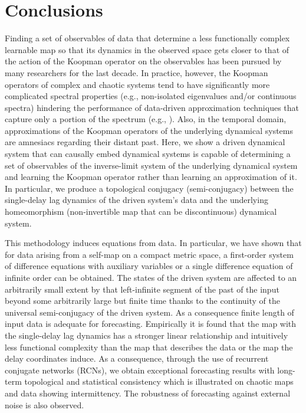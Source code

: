\documentclass[12 pt]{article}
\begin{document}


\section{Conclusions}
 Finding a set of observables of data that determine a less functionally complex learnable map so that its dynamics in the observed space gets closer to that of the action of the Koopman operator on the observables has been pursued by many researchers for the last decade. In practice, however, the Koopman operators of complex and chaotic systems tend to have significantly more complicated spectral properties (e.g., non-isolated eigenvalues and/or continuous spectra) hindering the performance of data-driven approximation techniques that capture only a portion of the spectrum (e.g., \cite{budivsic2012applied,korda2020data}). Also, in the temporal domain, approximations of the Koopman operators of the underlying dynamical systems are amnesiacs regarding their distant past. 
  Here, we show a driven dynamical system that can causally embed dynamical systems is capable of determining a set of observables of the inverse-limit system of the underlying dynamical system and learning the Koopman operator rather than learning an approximation of it. 
 In particular, we produce a topological conjugacy (semi-conjugacy) between the single-delay lag dynamics of the driven system's data and the underlying homeomorphism (non-invertible map that can be discontinuous) dynamical system. 
 
 
 This methodology induces equations from data. In particular, we have shown that for data arising from a self-map on a compact metric space,  a first-order system of difference equations with auxiliary variables or a single difference equation of infinite order can be obtained.  The states of the driven system are affected to an arbitrarily small extent by that left-infinite segment of the past of the input beyond some arbitrarily large but finite time thanks to the continuity of the universal semi-conjugacy of the driven system. As a consequence finite length of input data is adequate for forecasting. Empirically it is found that the map with the single-delay lag dynamics has a stronger linear relationship and intuitively less functional complexity than the map that describes the data or the map the delay coordinates induce.  As a consequence, through the use of recurrent conjugate networks (RCNs),  we obtain exceptional forecasting results with long-term topological and statistical consistency which is illustrated on chaotic maps and data showing intermittency. 
The robustness of forecasting against external noise is also observed.
\end{document}
